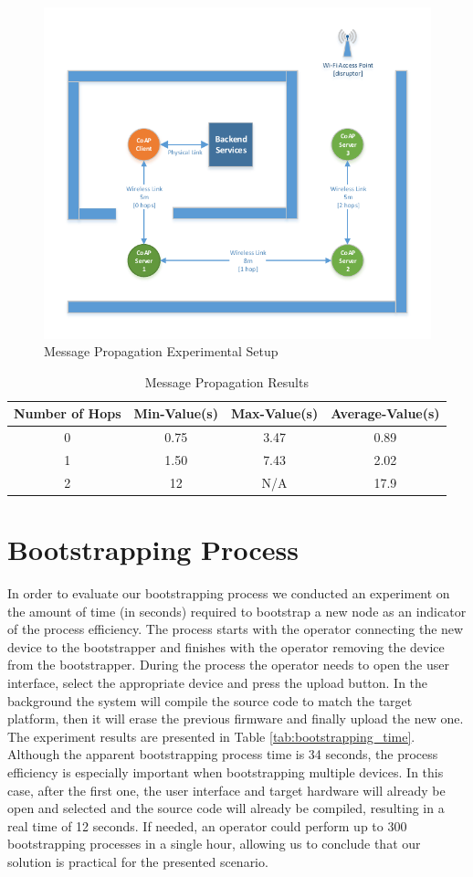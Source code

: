 \begin{figure}
  \centering
  \includegraphics[width=0.8\linewidth]{figures/PropagationExperiment.pdf}
  \caption{Message Propagation Experimental Setup}
  \label{fig:message_propagation_experiment}
\end{figure}

\begin{table}
\centering
\caption{Message Propagation Results}
\label{tab:message_propagation_results}
\begin{tabular}{|c|c|c|c|} \hline
Number of Hops&Min-Value(s)&Max-Value(s)&Average-Value(s)\\ \hline
0& 0.75& 3.47&0.89\\ \hline
1& 1.50& 7.43&2.02\\ \hline
2& 12& N/A&17.9\\ 
\hline\end{tabular}
\end{table}



\section{Bootstrapping Process}
In order to evaluate our bootstrapping process we conducted an experiment on the amount of time (in seconds) required to bootstrap a new node as an indicator of the process efficiency. The process starts with the operator connecting the new device to the bootstrapper and finishes with the operator removing the device from the bootstrapper. During the process the operator needs to open the user interface, select the appropriate device and press the upload button. In the background the system will compile the source code to match the target platform, then it will erase the previous firmware and finally upload the new one. The experiment results are presented in Table \ref{tab:bootstrapping_time}. Although the apparent bootstrapping process time is 34 seconds, the process efficiency is especially important when bootstrapping multiple devices. In this case, after the first one, the user interface and target hardware will already be open and selected and the source code will already be compiled, resulting in a real time of 12 seconds. If needed, an operator could perform up to 300 bootstrapping processes in a single hour, allowing us to conclude that our solution is practical for the presented scenario.

